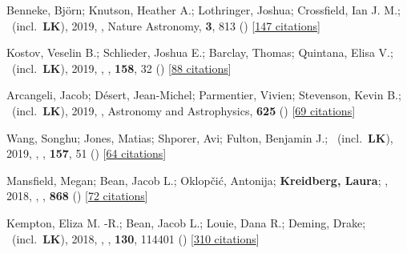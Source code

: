 \item[{\color{numcolor}\scriptsize29}] Benneke, Bj{\"o}rn; Knutson, Heather A.; Lothringer, Joshua; Crossfield, Ian J. M.; \etal\ (incl.\ \textbf{LK}), 2019, , Nature Astronomy, \textbf{3}, 813 () [\href{https://ui.adsabs.harvard.edu/abs/2019NatAs...3..813B}{147 citations}]

\item[{\color{numcolor}\scriptsize28}] Kostov, Veselin B.; Schlieder, Joshua E.; Barclay, Thomas; Quintana, Elisa V.; \etal\ (incl.\ \textbf{LK}), 2019, , \aj, \textbf{158}, 32 () [\href{https://ui.adsabs.harvard.edu/abs/2019AJ....158...32K}{88 citations}]

\item[{\color{numcolor}\scriptsize27}] Arcangeli, Jacob; D{\'e}sert, Jean-Michel; Parmentier, Vivien; Stevenson, Kevin B.; \etal\ (incl.\ \textbf{LK}), 2019, , Astronomy and Astrophysics, \textbf{625} () [\href{https://ui.adsabs.harvard.edu/abs/2019A&A...625A.136A}{69 citations}]

\item[{\color{numcolor}\scriptsize26}] Wang, Songhu; Jones, Matias; Shporer, Avi; Fulton, Benjamin J.; \etal\ (incl.\ \textbf{LK}), 2019, , \aj, \textbf{157}, 51 () [\href{https://ui.adsabs.harvard.edu/abs/2019AJ....157...51W}{64 citations}]

\item[{\color{numcolor}\scriptsize25}] Mansfield, Megan; Bean, Jacob L.; Oklop{\v{c}}i{\'c}, Antonija; \textbf{Kreidberg, Laura}; \etal, 2018, , \apj, \textbf{868} () [\href{https://ui.adsabs.harvard.edu/abs/2018ApJ...868L..34M}{72 citations}]

\item[{\color{numcolor}\scriptsize24}] Kempton, Eliza M. -R.; Bean, Jacob L.; Louie, Dana R.; Deming, Drake; \etal\ (incl.\ \textbf{LK}), 2018, , \pasp, \textbf{130}, 114401 () [\href{https://ui.adsabs.harvard.edu/abs/2018PASP..130k4401K}{310 citations}]

